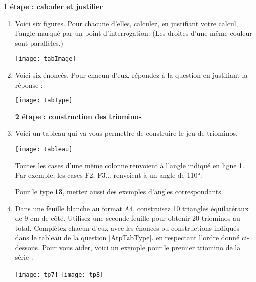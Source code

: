 \begin{TP}


\textbf{1 étape : calculer et justifier}

\begin{enumerate}
\item Voici six figures. Pour chacune d'elles, calculez, en justifiant votre calcul, l'angle marqué par un point d'interrogation. (Les droites d'une même couleur sont parallèles.)

\begin{center}
    \texttt{[image: tabImage]}
\end{center}


\item Voici six énoncés. Pour chacun d'eux, répondez à la question en justifiant la réponse :

\begin{center}
    \texttt{[image: tabType]}
\end{center}


\vspace{1em}\textbf{2 étape : construction des triominos}\vspace{1em}

\item \label{AtpTabType} Voici un tableau qui va vous permettre de construire le jeu de triominos. 

\begin{center}
    \texttt{[image: tableau]}
\end{center}

Toutes les cases d'une même colonne renvoient à l'angle indiqué en ligne 1. Par exemple, les cases F2, F3... renvoient à un angle de 110°.

Pour le type \textbf{t3}, mettez aussi des exemples d'angles correspondants.

\item Dans une feuille blanche au format A4, construisez 10 triangles équilatéraux de 9 cm de côté. Utilisez une seconde feuille pour obtenir 20 triominos au total. Complétez chacun d'eux avec les énoncés ou constructions indiqués dans le tableau de la question \ref{AtpTabType}. en respectant l'ordre donné ci-dessous. Pour vous aider, voici un exemple pour le premier triomino de la série :

\hfill\texttt{[image: tp7]} \hfill \texttt{[image: tp8]}\hfill\phantom{.}
 

\end{enumerate}
\end{TP}
